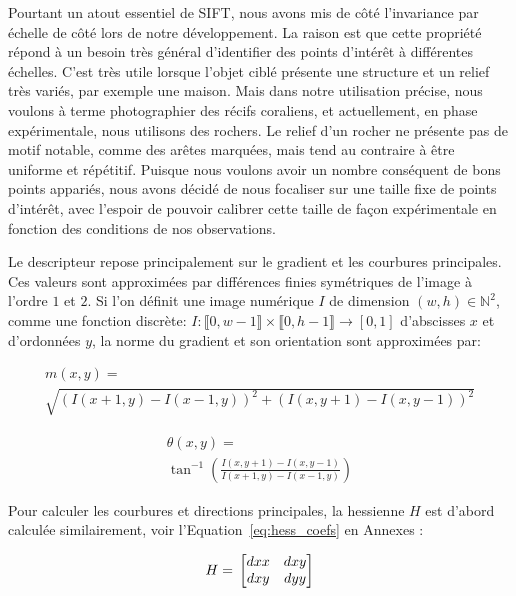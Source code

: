 \documentclass[
	a4paper, %
	10pt, %
	unnumberedsections, %
	twoside, %
]{LTJournalArticle}
\begin{document}
Pourtant un atout essentiel de SIFT, nous avons mis de côté l'invariance par échelle
de côté lors de notre développement. La raison est que cette propriété
répond à un besoin très général d'identifier des points d'intérêt à différentes
échelles. C'est très utile lorsque l'objet ciblé présente une structure et
un relief très variés, par exemple une maison. Mais dans notre utilisation précise,
nous voulons à terme photographier des récifs coraliens, et actuellement, en
phase expérimentale, nous utilisons des rochers. Le relief d'un rocher ne présente
pas de motif notable, comme des arêtes marquées, mais tend au contraire à être
uniforme et répétitif. Puisque nous voulons avoir un nombre conséquent de bons points
appariés, nous avons décidé de nous focaliser sur une taille fixe de points d'intérêt,
avec l'espoir de pouvoir calibrer cette taille de façon expérimentale en fonction
des conditions de nos observations.


Le descripteur repose principalement sur le gradient et les courbures principales.
Ces valeurs sont approximées par différences finies symétriques de l'image à l'ordre $1$ et $2$.
Si l'on définit une image numérique $I$ de dimension $(w, h) \in \mathbb{N}^2$,
comme une fonction discrète:
$I: \llbracket 0, w-1 \rrbracket \times \llbracket 0, h-1 \rrbracket \rightarrow [0, 1]$
d'abscisses $x$ et d'ordonnées $y$, la norme du gradient
et son orientation sont approximées par:

\begin{multline}
	m(x, y) = \\
	\sqrt{(I(x+1, y) - I(x-1,y))^2 + (I(x,y+1)-I(x,y-1))^2}
\end{multline}

\begin{multline}
	\theta(x, y) = \\
	\tan^{-1}\left(\frac{I(x,y+1)-I(x,y-1)}{I(x+1, y) - I(x-1,y)}\right)
\end{multline}

Pour calculer les courbures et directions principales, la hessienne $H$ est d'abord calculée
similairement, voir l'Equation~\ref{eq:hess_coefs} en Annexes :

\begin{equation}
	H = \\
	\begin{bmatrix}
		dxx & dxy \\
		dxy & dyy
	\end{bmatrix}
\end{equation}
\end{document}
